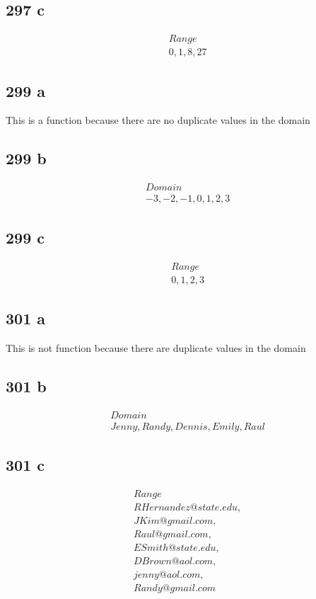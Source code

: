 \documentclass{article}
\begin{document}
    \subsection*{297 c}
    \begin{align*}
        &Range\\
        &0, 1, 8, 27
    \end{align*}

    \subsection*{299 a}
        This is a function because there are no duplicate values in the domain\\


    \subsection*{299 b}
    \begin{align*}
        &Domain\\
        &-3, -2, -1, 0, 1, 2, 3
    \end{align*}

    \subsection*{299 c}
    \begin{align*}
        &Range\\
        &0, 1, 2, 3
    \end{align*}

    \subsection*{301 a}
        This is not function because there are duplicate values in the domain

    \subsection*{301 b}
    \begin{align*}
        &Domain\\
        &Jenny, Randy, Dennis, Emily, Raul
    \end{align*}

    \subsection*{301 c}
    \begin{align*}
        &Range\\
        &RHernandez@state.edu,\\
        &JKim@gmail.com, \\
        &Raul@gmail.com, \\
        &ESmith@state.edu,\\
        &DBrown@aol.com,\\
        &jenny@aol.com,\\
        &Randy@gmail.com
    \end{align*}
\end{document}
